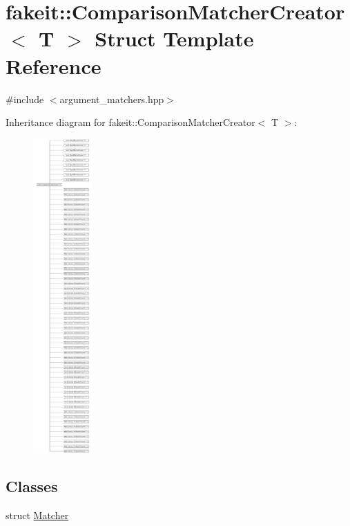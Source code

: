 \hypertarget{structfakeit_1_1ComparisonMatcherCreator}{}\section{fakeit\+::Comparison\+Matcher\+Creator$<$ T $>$ Struct Template Reference}
\label{structfakeit_1_1ComparisonMatcherCreator}


{\ttfamily \#include $<$argument\+\_\+matchers.\+hpp$>$}

Inheritance diagram for fakeit\+::Comparison\+Matcher\+Creator$<$ T $>$\+:\begin{figure}[H]
\begin{center}
\leavevmode
\includegraphics[height=12.000000cm]{structfakeit_1_1ComparisonMatcherCreator}
\end{center}
\end{figure}
\subsection*{Classes}
\begin{DoxyCompactItemize}
\item 
struct \mbox{\hyperlink{structfakeit_1_1ComparisonMatcherCreator_1_1Matcher}{Matcher}}
\end{DoxyCompactItemize}

